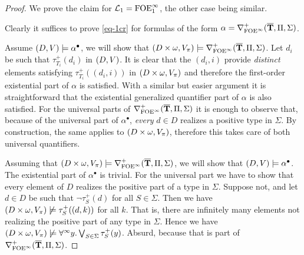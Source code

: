 \begin{proof}
We prove the claim for $\mathcal{L}_1={\mathrm{FOE}^{\infty}_1}$, the other case being similar.

Clearly it suffices to prove \eqref{eq-1cr} for formulas of the form
$\alpha = \nabla^+_{{\mathrm{FOE}}^\infty}(\overline{{\mathbf{T}}},\Pi,\Sigma)$.
\smallskip

\noindent\fbox{$\Rightarrow$} 
Assume $(D,V) \models \alpha^{\bullet}$, we will show that 
$(D\times \omega,V_\pi) \models \nabla^+_{{\mathrm{FOE}}^\infty}(\overline{{\mathbf{T}}},\Pi,\Sigma)$.
Let $d_i$ be such that $\tau_{T_i}^+(d_i)$ in $(D,V)$. 
It is clear that the $(d_i,i)$ provide \emph{distinct} elements satisfying 
$\tau_{T_i}^+((d_i,i))$ in $(D\times\omega,V_{\pi})$ and therefore the 
first-order existential part of $\alpha$ is satisfied. 
With a similar but easier argument it is straightforward that the existential 
generalized quantifier part of $\alpha$ is also satisfied.
%
For the universal parts of $\nabla^+_{{\mathrm{FOE}}^\infty}(\overline{{\mathbf{T}}},\Pi,\Sigma)$ it is enough to observe that, because of the universal part of $\alpha^\bullet$, \emph{every} $d\in D$ realizes a positive type in $\Sigma$. By construction, the same applies to $(D\times\omega,V_{\pi})$, 
therefore this takes care of both universal quantifiers.
\medskip
		
\noindent\fbox{$\Leftarrow$} 
Assuming that $(D\times \omega,V_\pi) \models 
\nabla^+_{{\mathrm{FOE}}^\infty}(\overline{{\mathbf{T}}},\Pi,\Sigma)$,
we will show that $(D,V) \models \alpha^\bullet$. 
The existential part of $\alpha^{\bullet}$ is trivial. 
For the universal part we have to show that every element of $D$ realizes the 
positive part of a type in $\Sigma$. 
Suppose not, and let $d\in D$ be such that $\lnot\tau_S^+(d)$ for all $S\in 
\Sigma$. 
Then we have $(D\times\omega,V_\pi) \not\models \tau_S^+((d,k))$ for all $k$.
That is, there are infinitely many elements not realizing the positive part of 
any type in $\Sigma$. 
Hence we have $(D\times\omega,V_\pi) \not\models \forall^\infty y.\bigvee_{S\in\Sigma} 
\tau_S^+(y)$. 
Absurd, because that is part of $\nabla^+_{{\mathrm{FOE}}^\infty}(\overline{{\mathbf{T}}},\Pi,\Sigma)$.
\end{proof}

